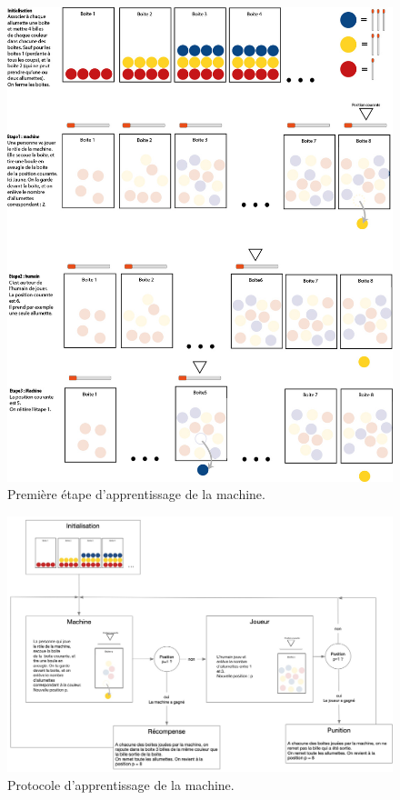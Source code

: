 \documentclass[a4paper,12pt]{article}
\begin{document}
\begin{figure}[h!]
\centering
\includegraphics[scale = 0.7]{./Images/fig3-v2.jpg}
\caption{Première étape d'apprentissage de la machine.}
\label{fig:PremApprentissage}
\end{figure}

\begin{figure}[h!]
\centering
\includegraphics[scale = 0.7]{./Images/fig1-v3.jpg}
\caption{Protocole d'apprentissage de la machine.}
\label{fig:ProtocoleApprentissage}
\end{figure}
\end{document}
